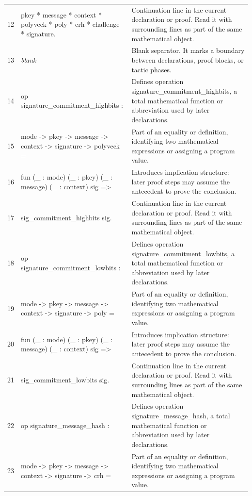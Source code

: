 \documentclass[10pt]{article}
\begin{document}
\begin{longtable}{r L{0.53\textwidth} L{0.37\textwidth}}
12 & {\ttfamily\scriptsize   pkey * message * context * polyveck * poly * crh * challenge * signature.} & Continuation line in the current declaration or proof.  Read it with surrounding lines as part of the same mathematical object. \\
13 & {\ttfamily\scriptsize \emph{blank}} & Blank separator.  It marks a boundary between declarations, proof blocks, or tactic phases. \\
14 & {\ttfamily\scriptsize op signature\_commitment\_highbits :} & Defines operation signature\_commitment\_highbits, a total mathematical function or abbreviation used by later declarations. \\
15 & {\ttfamily\scriptsize   mode -> pkey -> message -> context -> signature -> polyveck =} & Part of an equality or definition, identifying two mathematical expressions or assigning a program value. \\
16 & {\ttfamily\scriptsize   fun (\_ : mode) (\_ : pkey) (\_ : message) (\_ : context) sig =>} & Introduces implication structure: later proof steps may assume the antecedent to prove the conclusion. \\
17 & {\ttfamily\scriptsize     sig\_commitment\_highbits sig.} & Continuation line in the current declaration or proof.  Read it with surrounding lines as part of the same mathematical object. \\
18 & {\ttfamily\scriptsize op signature\_commitment\_lowbits :} & Defines operation signature\_commitment\_lowbits, a total mathematical function or abbreviation used by later declarations. \\
19 & {\ttfamily\scriptsize   mode -> pkey -> message -> context -> signature -> poly =} & Part of an equality or definition, identifying two mathematical expressions or assigning a program value. \\
20 & {\ttfamily\scriptsize   fun (\_ : mode) (\_ : pkey) (\_ : message) (\_ : context) sig =>} & Introduces implication structure: later proof steps may assume the antecedent to prove the conclusion. \\
21 & {\ttfamily\scriptsize     sig\_commitment\_lowbits sig.} & Continuation line in the current declaration or proof.  Read it with surrounding lines as part of the same mathematical object. \\
22 & {\ttfamily\scriptsize op signature\_message\_hash :} & Defines operation signature\_message\_hash, a total mathematical function or abbreviation used by later declarations. \\
23 & {\ttfamily\scriptsize   mode -> pkey -> message -> context -> signature -> crh =} & Part of an equality or definition, identifying two mathematical expressions or assigning a program value. \\

\end{longtable}
\end{document}
